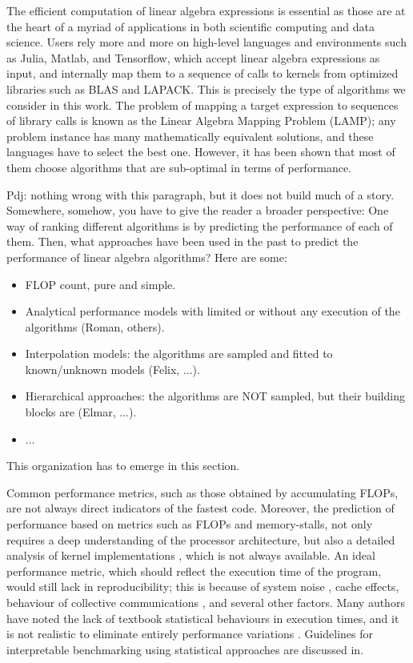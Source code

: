 \documentclass[conference]{IEEEtran}
\newcommand{\p}[1]{{\color{blue} Pdj: #1}}
\begin{document}
The efficient computation of linear algebra expressions is essential as those are at the heart of a myriad of
applications in both scientific computing and data science. Users rely more and more on high-level languages and
environments such as Julia\cite{julia}, Matlab\cite{MatlabOTB}, and Tensorflow\cite{tensorflow}, which accept linear
algebra expressions as input, and internally map them to a sequence of calls to kernels from optimized libraries such as
BLAS and LAPACK. This is precisely the type of algorithms we consider in this work. The problem of mapping a target
expression to sequences of library calls is known as the Linear Algebra Mapping Problem (LAMP)\cite{psarras2019linear};
any problem instance has many mathematically equivalent solutions, and these languages have to select the best
one. However, it has been shown that most of them choose algorithms that are sub-optimal in terms of performance\cite{psarras2019linear}.


\p{nothing wrong with this paragraph, but it does not build much of a story. Somewhere, somehow, you have to give the
  reader a broader perspective: One way of ranking different algorithms is by predicting the performance of each of
  them. Then, what approaches have been used in the past to predict the performance of linear algebra algorithms? Here
  are some:
  \begin{itemize}
  \item FLOP count, pure and simple.
  \item Analytical performance models with limited or without any execution of the algorithms (Roman, others).
  \item Interpolation models: the algorithms are sampled and fitted to known/unknown models (Felix, ...).
  \item Hierarchical approaches: the algorithms are NOT sampled, but their building blocks are (Elmar, ...). 
  \item ...
  \end{itemize}
  This organization has to emerge in this section.
}

  
Common performance metrics, such as those obtained by accumulating FLOPs, are not always direct indicators of the
fastest code\cite{barthels2019linnea}. Moreover, the prediction of performance based on metrics such as FLOPs and
memory-stalls, not only requires a deep understanding of the processor architecture, but also a detailed analysis of
kernel implementations \cite{iakymchuk2012modeling} \cite{iakymchuk2011execution}, which is not always available. An
ideal performance metric, which should reflect the execution time of the program, would still lack in reproducibility;
this is because of system noise \cite{hoefler2010characterizing}, cache effects\cite{peise2014cache}, behaviour of
collective communications \cite{agarwal2005impact}, and several other factors. Many authors have noted the lack of
textbook statistical behaviours in execution times, and it is not realistic to eliminate entirely performance variations \cite{robustbenchmarking} \cite{trackingPerfVariation} \cite{statiscalperfCompare}. Guidelines for interpretable benchmarking using statistical approaches are discussed in\cite{hoefler2015scientific}.
\end{document}
